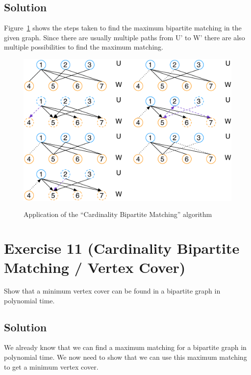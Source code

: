 \documentclass[a4paper, 12pt]{report}
\begin{document}
\subsection{Solution}

Figure~\ref{figure:Exercise_2_10_Maximum_Matching} shows the steps taken to
find the maximum bipartite matching in the given graph. Since there are usually
multiple paths from U' to W' there are also multiple possibilities to find the
maximum matching.

\begin{figure}[htbp]
    \caption{Application of the “Cardinality Bipartite Matching” algorithm}
    \vskip 0.2cm
    \centering
    \includegraphics[width=\textwidth]{Figures/Exercise_2_10_Maximum_Matching}
    \label{figure:Exercise_2_10_Maximum_Matching}
\end{figure}

\section{Exercise 11 (Cardinality Bipartite Matching / Vertex Cover)}

Show that a minimum vertex cover can be found in a bipartite graph in
polynomial time.

\subsection{Solution}

We already know that we can find a maximum matching for a bipartite graph in
polynomial time. We now need to show that we can use this maximum matching to
get a minimum vertex cover.\\
\end{document}

